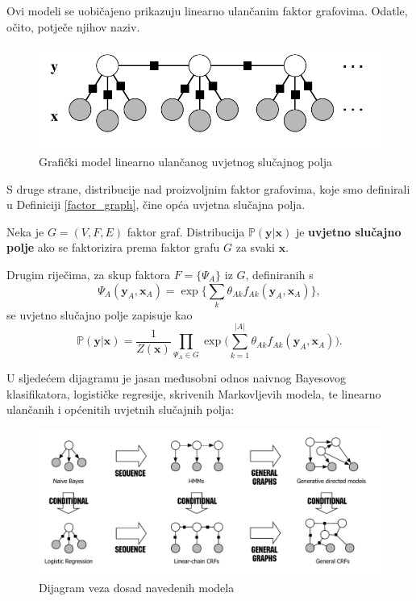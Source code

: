 \documentclass[a4paper,twoside,12pt]{memoir} %
\newcommand{\tb}{\textbf}
\begin{document}
	\bigskip

	Ovi modeli se uobičajeno prikazuju linearno ulančanim faktor grafovima. Odatle, očito, potječe njihov naziv.

	\begin{figure}[H]
		\centering
		\includegraphics[scale = 0.4]{linear_chain_crf.png}
		\caption{Grafički model linearno ulančanog uvjetnog slučajnog polja}
	\end{figure}

	S druge strane, distribucije nad proizvoljnim faktor grafovima, koje smo definirali u Definiciji \ref{factor_graph}, čine opća uvjetna slučajna polja.

	\begin{defn}
		Neka je $G = (V, F, E)$ faktor graf. Distribucija $\mathbb{P}(\mathbf{y} | \mathbf{x})$ je \tb{uvjet\-no slučajno polje} ako se faktorizira prema faktor grafu $G$ za svaki $\mathbf{x}$.
	\end{defn}

	Drugim riječima, za skup faktora $F = \{ \Psi_A \}$ iz $G$, definiranih s
	\begin{equation*}
	\Psi_A(\mathbf{y}_A, \mathbf{x}_A) = \exp {\bigg\{\sum_{k} \theta_{Ak} f_{Ak} (\mathbf{y}_A, \mathbf{x}_A)\bigg\}},
	\end{equation*}
	se uvjetno slučajno polje zapisuje kao
	\begin{equation*}
	\mathbb{P}(\mathbf{y} | \mathbf{x})  = \frac{1}{Z(\mathbf{x})} \prod_{\Psi_A \in G} \exp \bigg(\sum_{k=1}^{|A|}  \theta_{Ak} f_{Ak} (\mathbf{y}_A, \mathbf{x}_A)\bigg).
	\end{equation*}

	U sljedećem dijagramu je jasan međusobni odnos naivnog Bayesovog klasifikatora, logističke regresije, skrivenih Markovljevih modela, te linearno ulančanih i općenitih uvjetnih slučajnih polja:

	\begin{figure}[H]
		\centering
		\includegraphics[scale = 0.50]{all_ner.png}
		\caption{Dijagram veza dosad navedenih modela}
	\end{figure}
\end{document}
